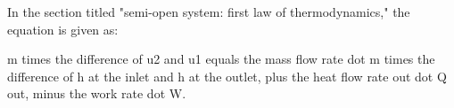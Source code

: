 In the section titled "semi-open system: first law of thermodynamics," the equation is given as:

m times the difference of u2 and u1 equals the mass flow rate dot m times the difference of h at the inlet and h at the outlet, plus the heat flow rate out dot Q out, minus the work rate dot W.